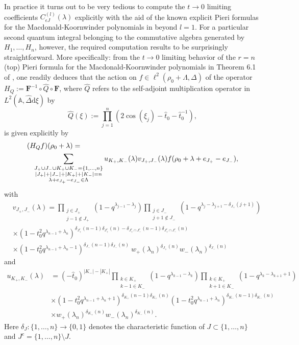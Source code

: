 \documentclass[reqno]{amsart}
\theoremstyle{remark}
\numberwithin{equation}{section}
\begin{document}
 In practice it turns out to be very tedious to compute the $t\to 0$ limiting coefficients
 $C^{(l)}_{\epsilon J} (\lambda) $  explicitly  with  the aid of the known explicit Pieri formulas for the
 Macdonald-Koornwinder polynomials  in \cite[~6]{die:properties} beyond $l =1$. 
For a particular second quantum integral belonging to the commutative algebra generated by $H_1,\ldots ,H_n$, however,  the required computation results to be surprisingly straightforward.
More specifically:  from the $t\to 0$ limiting behavior of the $r=n$ (top)
Pieri formula for the Macdonald-Koornwinder polynomials in Theorem 6.1 of \cite{die:properties}, one readily deduces that the action on $f\in\ell^2(\rho_0+\Lambda,\Delta)$ of the operator $H_Q:= \boldsymbol{F}^{-1}  \circ \hat{Q} \circ\boldsymbol{F}$, where $\hat{Q}$
 refers to the self-adjoint multiplication operator in
$L^2(\mathbb{A},\hat{\Delta}\text{d}\xi)$ by $$\hat{Q}(\xi):=\prod_{j=1}^n (2\cos (\xi_j)-\hat{t}_0-\hat{t}_0^{-1}),$$ is given explicitly by 
\begin{eqnarray}\label{HQ}
\lefteqn{ (H_Qf)(\rho_0+\lambda ) = } && \\
 && \sum_{\substack{J_+\cup J_-\cup K_+\cup K_-=\{1,\ldots,n\}   \\ |J_+|+| J_- |+ | K_+ |+| K_- |=n \\ \lambda + e_{J_+}-e_{J_-}\in\Lambda }     } 
 u_{K_+,K_-}(\lambda) v_{J_+,J_-}(\lambda ) f(\rho_0+\lambda+e_{J_+}-e_{J_-}) , \nonumber
 \end{eqnarray}
 with
 \begin{align*}
&  v_{J_+,J_-}(\lambda )  =
 \prod_{\substack{j\in J_+ \\ j-1\not\in J_+}} (1-q^{\lambda_{j-1}-\lambda_j})
  \prod_{\substack{j\in J_- \\ j+1\not\in J_-}} (1-q^{\lambda_{j}-\lambda_{j+1}-\delta_{J_+}(j+1)})  \\
 & \times (1-t_0^2q^{\lambda_{n-1}+\lambda_n})^{\delta_{J_+^c}(n-1)\delta_{J_+^c}(n)-\delta_{J_+^c\cap J_-^c}(n-1)\delta_{J_+^c\cap J_-^c}(n)} \\
&\times (1-t_0^2q^{\lambda_{n-1}+\lambda_n-1})^{\delta_{J_-}(n-1)\delta_{J_-}(n)}  \
w_+(\lambda_n)^{\delta_{J_+}(n)}w_-(\lambda_n)^{\delta_{J_-}(n)}
 \end{align*}
 and
 \begin{align*}
u_{K_+,K_-}(\lambda)  &=(-\hat{t}_0)^{|K_-|-|K_+|}  \prod_{\substack{k\in K_+\\ k-1\in K_-}} (1-q^{\lambda_{k-1}-\lambda_{k}}) 
  \prod_{\substack{k\in K_+ \\ k+1\in K_-}} (1-q^{\lambda_{k}-\lambda_{k+1}+1})\\
  &\times (1-t_0^2q^{\lambda_{n-1}+\lambda_n+1})^{\delta_{K_+}(n-1)\delta_{K_+}(n)}
  (1-t_0^2q^{\lambda_{n-1}+\lambda_n})^{\delta_{K_-}(n-1)\delta_{K_-}(n)} \\
  &\times w_+(\lambda_n)^{\delta_{K_+}(n)}w_-(\lambda_n)^{\delta_{K_-}(n)} .
  \end{align*}
Here $\delta_J:\{ 1,\ldots ,n\} \to \{ 0, 1\}$ denotes the characteristic function of $J\subset \{1,\ldots ,n\}$ and $J^c=\{ 1,\ldots ,n\}\setminus J$.
 
\end{document}
